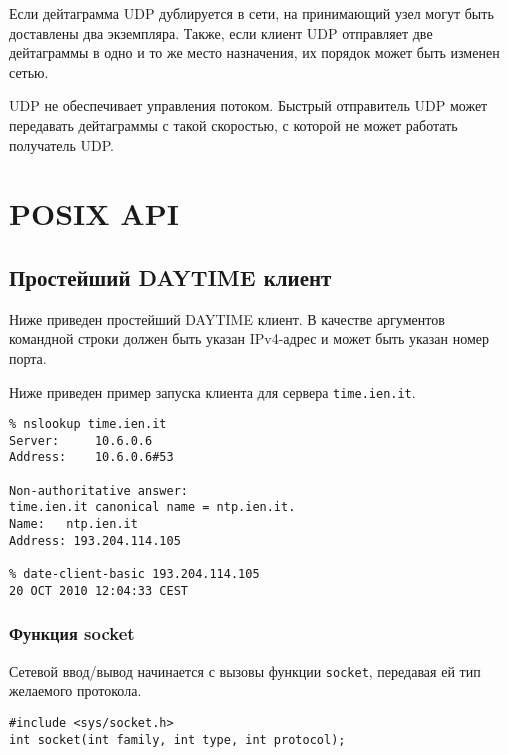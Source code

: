 Если дейтаграмма UDP дублируется в сети, на принимающий узел могут быть доставлены два экземпляра. Также, если клиент UDP отправляет две дейтаграммы в одно и то же место назначения, их порядок может быть изменен сетью.

UDP не обеспечивает управления потоком. Быстрый отправитель UDP может передавать дейтаграммы с такой скоростью, с которой не может работать получатель UDP.

\section{POSIX API}
\label{sec:network-api}

\subsection{Простейший DAYTIME клиент}
Ниже приведен простейший DAYTIME клиент. В качестве аргументов командной строки должен быть указан IPv4-адрес и может быть указан номер порта.

\lstset{label=lst:date-client-basic,caption=Простейший DAYTIME клиент}


Ниже приведен пример запуска клиента для сервера \texttt{time.ien.it}.

\lstset{language=,label=lst:basic-client-run,caption=Использование}
\begin{lstlisting}
% nslookup time.ien.it
Server:		10.6.0.6
Address:	10.6.0.6#53

Non-authoritative answer:
time.ien.it	canonical name = ntp.ien.it.
Name:	ntp.ien.it
Address: 193.204.114.105

% date-client-basic 193.204.114.105
20 OCT 2010 12:04:33 CEST
\end{lstlisting}

\subsubsection{Функция socket}
Сетевой ввод/вывод начинается с вызовы функции \lstinline{socket}, передавая ей тип желаемого протокола.
\lstset{language=C,caption=}
\begin{lstlisting}
#include <sys/socket.h>
int socket(int family, int type, int protocol);
\end{lstlisting}

